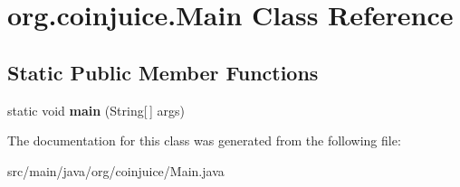 \hypertarget{classorg_1_1coinjuice_1_1_main}{\section{org.\-coinjuice.\-Main Class Reference}
\label{classorg_1_1coinjuice_1_1_main}
}
\subsection*{Static Public Member Functions}
\begin{DoxyCompactItemize}
\item 
\hypertarget{classorg_1_1coinjuice_1_1_main_a536a2586f63e9b20e414e1695d96da30}{static void {\bfseries main} (String\mbox{[}$\,$\mbox{]} args)}\label{classorg_1_1coinjuice_1_1_main_a536a2586f63e9b20e414e1695d96da30}

\end{DoxyCompactItemize}


The documentation for this class was generated from the following file\-:\begin{DoxyCompactItemize}
\item 
src/main/java/org/coinjuice/Main.\-java\end{DoxyCompactItemize}
